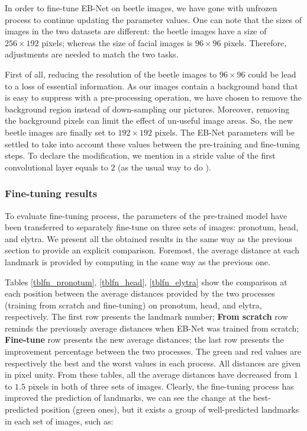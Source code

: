 \documentclass[review]{elsarticle}
\begin{document}
In order to fine-tune EB-Net on beetle images, we have gone with unfrozen process to continue updating the parameter values. One can note that the sizes of images in the two datasets are different: the beetle images have a size of $256 \times 192$ pixels; whereas the size of facial images is $96 \times 96$ pixels. Therefore, adjustments are needed to match the two tasks.

First of all, reducing the resolution of the beetle images to $96 \times 96$ could be lead to a loss of essential information. As our images contain a background band that is easy to suppress with a pre-processing operation, we have chosen to remove the background
region instead of down-sampling our pictures. Moreover, removing the background pixels can limit the effect of un-useful image areas. So, the new beetle images are finally set to $192 \times 192$ pixels. The EB-Net parameters will be settled to take into account these values between the pre-training and fine-tuning steps. To declare the modification, we mention in a stride value of the first convolutional layer equals to $2$ (as the usual way to do \cite{yosinski2014transferable}). 

\subsubsection{Fine-tuning results}
To evaluate fine-tuning process, the parameters of the pre-trained model have been transferred to
separately fine-tune on three sets of images: pronotum, head, and elytra. We present all the obtained results in the same way as the previous section to provide an explicit comparison. Foremost, the average distance at each landmark is provided by computing in the same way as the previous one.%

Tables \ref{tblfn_pronotum}, \ref{tblfn_head}, \ref{tblfn_elytra} show the comparison at each position between the average distances provided by the two processes (training from scratch and fine-tuning) on pronotum, head, and elytra, respectively.  The first row presents the landmark number; \textbf{From scratch} row reminds the previously average distances when EB-Net was trained from scratch; \textbf{Fine-tune} row presents the new average distances; the last row presents the improvement percentage between the two processes. The green and red values are respectively the best and the worst values in each process. All distances are given in pixel unity. From these tables, all the average distances have decreased from $1$ to $1.5$ pixels in both of three sets of images. Clearly, the fine-tuning process has improved the prediction of landmarks, we can see the change at the best-predicted position (green ones), but it exists a group of well-predicted landmarks in each set of images, such as:
\end{document}
